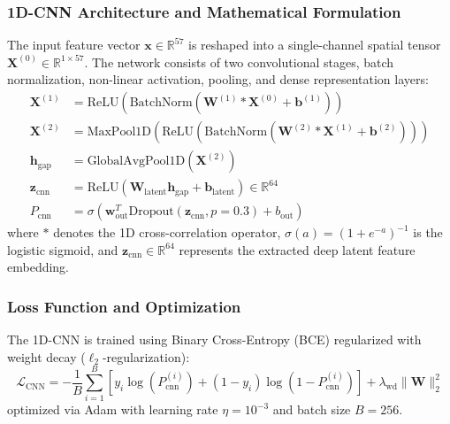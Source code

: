 \documentclass[preprint,12pt]{elsarticle}
\begin{document}
\subsubsection{1D-CNN Architecture and Mathematical Formulation}
The input feature vector $\mathbf{x} \in \mathbb{R}^{57}$ is reshaped into a single-channel spatial tensor $\mathbf{X}^{(0)} \in \mathbb{R}^{1 \times 57}$. The network consists of two convolutional stages, batch normalization, non-linear activation, pooling, and dense representation layers:
\begin{align}
    \mathbf{X}^{(1)} &= \text{ReLU}\left( \text{BatchNorm}\left( \mathbf{W}^{(1)} \ast \mathbf{X}^{(0)} + \mathbf{b}^{(1)} \right) \right) \\
    \mathbf{X}^{(2)} &= \text{MaxPool1D}\left( \text{ReLU}\left( \text{BatchNorm}\left( \mathbf{W}^{(2)} \ast \mathbf{X}^{(1)} + \mathbf{b}^{(2)} \right) \right) \right) \\
    \mathbf{h}_{\text{gap}} &= \text{GlobalAvgPool1D}\left( \mathbf{X}^{(2)} \right) \\
    \mathbf{z}_{\text{cnn}} &= \text{ReLU}\left( \mathbf{W}_{\text{latent}} \mathbf{h}_{\text{gap}} + \mathbf{b}_{\text{latent}} \right) \in \mathbb{R}^{64} \\
    P_{\text{cnn}} &= \sigma\left( \mathbf{w}_{\text{out}}^T \text{Dropout}(\mathbf{z}_{\text{cnn}}, p=0.3) + b_{\text{out}} \right)
\end{align}
where $\ast$ denotes the 1D cross-correlation operator, $\sigma(a) = (1 + e^{-a})^{-1}$ is the logistic sigmoid, and $\mathbf{z}_{\text{cnn}} \in \mathbb{R}^{64}$ represents the extracted deep latent feature embedding.

\subsubsection{Loss Function and Optimization}
The 1D-CNN is trained using Binary Cross-Entropy (BCE) regularized with weight decay ($\ell_2$-regularization):
\begin{equation}
    \mathcal{L}_{\text{CNN}} = -\frac{1}{B} \sum_{i=1}^B \left[ y_i \log(P_{\text{cnn}}^{(i)}) + (1 - y_i) \log(1 - P_{\text{cnn}}^{(i)}) \right] + \lambda_{\text{wd}} \|\mathbf{W}\|_2^2
\end{equation}
optimized via Adam with learning rate $\eta = 10^{-3}$ and batch size $B = 256$.
\end{document}
